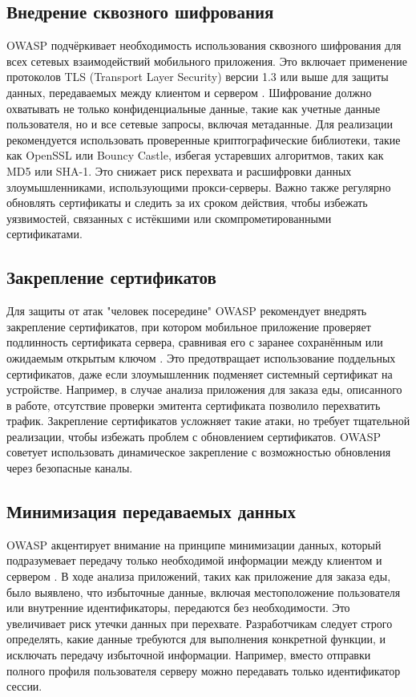 \subsection{Внедрение сквозного шифрования}
OWASP подчёркивает необходимость использования сквозного шифрования для всех сетевых взаимодействий мобильного приложения. Это включает применение протоколов TLS (Transport Layer Security) версии 1.3 или выше для защиты данных, передаваемых между клиентом и сервером \cite{nist_sp800_52}. Шифрование должно охватывать не только конфиденциальные данные, такие как учетные данные пользователя, но и все сетевые запросы, включая метаданные. Для реализации рекомендуется использовать проверенные криптографические библиотеки, такие как OpenSSL или Bouncy Castle, избегая устаревших алгоритмов, таких как MD5 или SHA-1. Это снижает риск перехвата и расшифровки данных злоумышленниками, использующими прокси-серверы. Важно также регулярно обновлять сертификаты и следить за их сроком действия, чтобы избежать уязвимостей, связанных с истёкшими или скомпрометированными сертификатами.

\subsection{Закрепление сертификатов}
Для защиты от атак "человек посередине" OWASP рекомендует внедрять закрепление сертификатов, при котором мобильное приложение проверяет подлинность сертификата сервера, сравнивая его с заранее сохранённым или ожидаемым открытым ключом \cite{owasp_mobile_top_10_2016}. Это предотвращает использование поддельных сертификатов, даже если злоумышленник подменяет системный сертификат на устройстве. Например, в случае анализа приложения для заказа еды, описанного в работе, отсутствие проверки эмитента сертификата позволило перехватить трафик. Закрепление сертификатов усложняет такие атаки, но требует тщательной реализации, чтобы избежать проблем с обновлением сертификатов. OWASP советует использовать динамическое закрепление с возможностью обновления через безопасные каналы.

\subsection{Минимизация передаваемых данных}
OWASP акцентирует внимание на принципе минимизации данных, который подразумевает передачу только необходимой информации между клиентом и сервером \cite{owasp_mobile_security_testing_guide}. В ходе анализа приложений, таких как приложение для заказа еды, было выявлено, что избыточные данные, включая местоположение пользователя или внутренние идентификаторы, передаются без необходимости. Это увеличивает риск утечки данных при перехвате. Разработчикам следует строго определять, какие данные требуются для выполнения конкретной функции, и исключать передачу избыточной информации. Например, вместо отправки полного профиля пользователя серверу можно передавать только идентификатор сессии.

